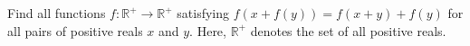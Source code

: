Find all functions $ f: \mathbb{R}^{ + }\to\mathbb{R}^{ + }$ satisfying $ f\left(x + f\left(y\right)\right) = f\left(x + y\right) + f\left(y\right)$ for all pairs of positive reals $ x$ and $ y$. Here, $ \mathbb{R}^{ + }$ denotes the set of all positive reals.
